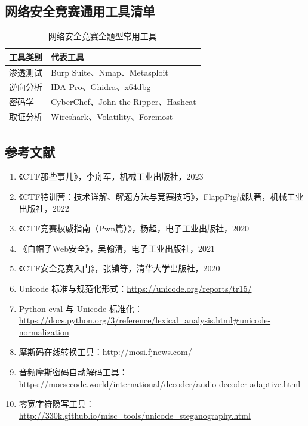 \subsection{网络安全竞赛通用工具清单}
\begin{table}[htbp]
    \centering
    \caption{网络安全竞赛全题型常用工具}
    \begin{tabular}{ll}
        \toprule
        工具类别 & 代表工具 \\
        \midrule
        渗透测试 & Burp Suite、Nmap、Metasploit \\
        逆向分析 & IDA Pro、Ghidra、x64dbg \\
        密码学 & CyberChef、John the Ripper、Hashcat \\
        取证分析 & Wireshark、Volatility、Foremost \\
        \bottomrule
    \end{tabular}
\end{table}

\subsection{参考文献}
\begin{enumerate}[leftmargin=*]
    \item 《CTF那些事儿》，李舟军，机械工业出版社，2023
    \item 《CTF特训营：技术详解、解题方法与竞赛技巧》，FlappPig战队著，机械工业出版社，2022
    \item 《CTF竞赛权威指南（Pwn篇）》，杨超，电子工业出版社，2020
    \item 《白帽子Web安全》，吴翰清，电子工业出版社，2021
    \item 《CTF安全竞赛入门》，张镇等，清华大学出版社，2020
    \item Unicode 标准与规范化形式：\url{https://unicode.org/reports/tr15/}
    \item Python eval 与 Unicode 标准化：\url{https://docs.python.org/3/reference/lexical_analysis.html#unicode-normalization}
    \item 摩斯码在线转换工具：\url{http://mosi.fjnews.com/}
    \item 音频摩斯密码自动解码工具：\url{https://morsecode.world/international/decoder/audio-decoder-adaptive.html}
    \item 零宽字符隐写工具：\url{http://330k.github.io/misc_tools/unicode_steganography.html}
\end{enumerate}
